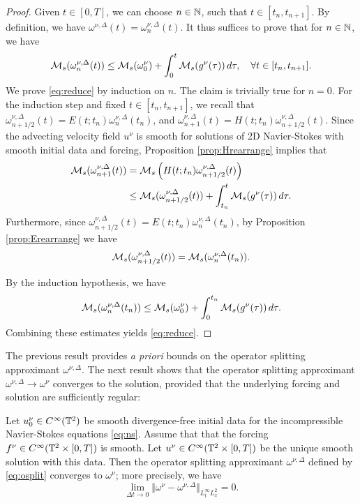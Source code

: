 \documentclass[reqno,12pt]{amsart}
\begin{document}
\begin{proof}
  Given $t\in [0,T]$, we can choose $n\in \mathbb{N}$, such that $t\in [t_n,t_{n+1}]$. By definition, we have $\omega^{\nu,\Delta}(t) = \omega^{\nu,\Delta}_n(t)$. It thus suffices to prove that for $n\in \mathbb{N}$, we have
  \begin{align}
    \label{eq:reduce}
  \mathcal{M}_s (\omega^{\nu,\Delta}_n(t))
  \le
  \mathcal{M}_s (\omega^\nu_0)
  +
  \int_0^t \mathcal{M}_s (g^\nu(\tau)) \, d\tau,
  \quad \forall t\in [t_n,t_{n+1}].
  \end{align}
  We prove \eqref{eq:reduce} by induction on $n$. The claim is trivially true for $n=0$. For the induction step and fixed $t \in [t_{n},t_{n+1}]$, we recall that $\omega^{\nu,\Delta}_{n+1/2}(t) = E(t;t_n) {\omega}_n^{\nu,\Delta}(t_n)$, and ${\omega}^{\nu,\Delta}_{n+1}(t) = H(t;t_n) \omega^{\nu,\Delta}_{n+1/2}(t)$. Since the advecting velocity field $u^\nu$ is smooth for solutions of 2D Navier-Stokes with smooth initial data and forcing, Proposition \ref{prop:Hrearrange} implies that
\begin{align*}
 \mathcal{M}_s({\omega}^{\nu,\Delta}_{n+1}(t))
 &=
 \mathcal{M}_s\left(H(t;t_n) \omega_{n+1/2}^{\nu,\Delta}(t)\right)
 \\
 &\le
  \mathcal{M}_s (\omega_{n+1/2}^{\nu,\Delta}(t)) + \int_{t_n}^t \mathcal{M}_s(g^\nu(\tau)) \, d\tau.
\end{align*}
Furthermore, since $\omega_{n+1/2}^{\nu,\Delta}(t) = E(t;t_n)\omega_{n}^{\nu,\Delta}(t_n)$, by Proposition \ref{prop:Erearrange} we have
\[
  \mathcal{M}_s (\omega_{n+1/2}^{\nu,\Delta}(t))
  =
  \mathcal{M}_s ({\omega}_{n}^{\nu,\Delta}(t_n)).
\]

By the induction hypothesis, we have
\[
\mathcal{M}_s ({\omega}_{n}^{\nu,\Delta}(t_n))
\le
\mathcal{M}_s (\omega^\nu_0)
+
\int_0^{t_n} \mathcal{M}_s (g^\nu(\tau)) \, d\tau.
\]
Combining these estimates yields \eqref{eq:reduce}.
\end{proof}

The previous result provides {\it a priori} bounds on the operator splitting approximant $\omega^{\nu,\Delta}$. The next result shows that the operator splitting approximant $\omega^{\nu,\Delta} \to \omega^\nu$ converges to the solution, provided that the underlying forcing and solution are sufficiently regular:
  \begin{proposition}
    \label{prop:osplit-conv}
    Let $u^\nu_0\in C^\infty(\mathbb{T}^2)$ be smooth divergence-free initial data for the incompressible Navier-Stokes equations \eqref{eq:ns}. Assume that that the forcing $f^\nu \in C^\infty(\mathbb{T}^2\times [0,T])$ is smooth. Let $u^\nu \in C^\infty(\mathbb{T}^2\times [0,T])$ be the unique smooth solution with this data. Then the operator splitting approximant $\omega^{\nu,\Delta}$ defined by \eqref{eq:osplit} converges to $\omega^\nu$; more precisely, we have
    \[
    \lim_{\Delta t \to 0} \Vert \omega^{\nu} - \omega^{\nu,\Delta} \Vert_{L^\infty_t L^2_x} = 0.
    \]
  \end{proposition}
\end{document}
